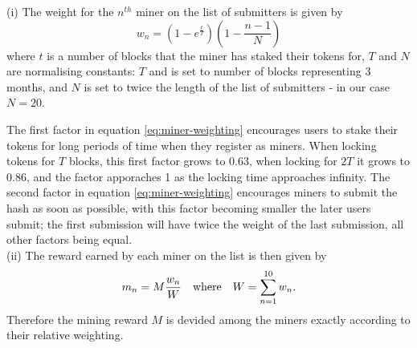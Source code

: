 \noindent (i) The weight for the $n^{th}$ miner on the list of submitters is given by
\begin{equation}\label{eq:miner-weighting}
 w_n = \left(1 - e^{\frac{t}{T}}\right) \left( 1 - \frac{n-1}{N} \right)
\end{equation}
where $t$ is a number of blocks that the miner has staked their tokens for, $T$ and $N$ are normalising constants: $T$ and is set to number of blocks representing 3 months, and $N$ is set to twice the length of the list of submitters - in our case $N=20$.

The first factor in equation \eqref{eq:miner-weighting} encourages users to stake their tokens for long periods of time when they register as miners. When locking tokens for $T$ blocks, this first factor grows to 0.63, when locking for $2T$ it grows to 0.86, and the factor apporaches 1 as the locking time approaches infinity. The second factor in equation \eqref{eq:miner-weighting} encourages miners to submit the hash as soon as possible, with this factor becoming smaller the later users submit; the first submission will have twice the weight of the last submission, all other factors being equal.\\

\noindent (ii) The reward earned by each miner on the list is then given by
\begin{equation}\label{eq:miner-payout}
 m_n = M \frac{w_n}{W} \quad \textnormal{where} \quad W = \sum_{n=1}^{10} w_n.
\end{equation}
Therefore the mining reward $M$ is devided among the miners exactly according to their relative weighting. 
% 
% 
% 
% 
% 
